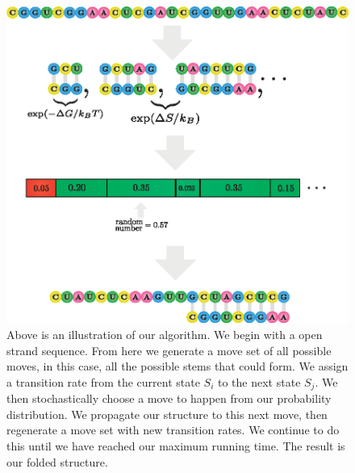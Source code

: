 \documentclass[11pt]{article}
\begin{document}
\begin{figure}[H]
\centering
\includegraphics[scale = 1.1]{fig/rna_gillespie_algo}
\caption{Above is an illustration of our algorithm. We begin with a open strand sequence. From here we generate a move set of all possible moves, in this case, all the possible stems that could form. We assign a transition rate from the current state $S_{i}$ to the next state $S_{j}$. We then stochastically choose a move to happen from our probability distribution. We propagate our structure to this next move, then regenerate a move set with new transition rates. We continue to do this until we have reached our maximum running time. The result is our folded structure. }
\label{fig:gill_algo}
\end{figure}
\end{document}
